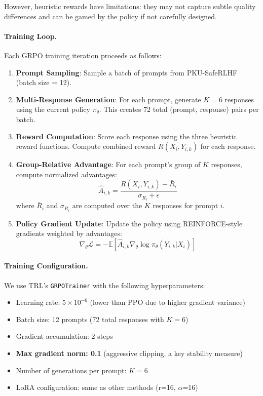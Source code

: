 However, heuristic rewards have limitations: they may not capture subtle quality differences and can be gamed by the policy if not carefully designed.

\paragraph{Training Loop.} Each GRPO training iteration proceeds as follows:

\begin{enumerate}[leftmargin=*]
    \item \textbf{Prompt Sampling}: Sample a batch of prompts from PKU-SafeRLHF (batch size = 12).

    \item \textbf{Multi-Response Generation}: For each prompt, generate $K=6$ responses using the current policy $\pi_\theta$. This creates 72 total (prompt, response) pairs per batch.

    \item \textbf{Reward Computation}: Score each response using the three heuristic reward functions. Compute combined reward $R(X_i, Y_{i,k})$ for each response.

    \item \textbf{Group-Relative Advantage}: For each prompt's group of $K$ responses, compute normalized advantages:
    \begin{equation*}
        \hat{A}_{i,k} = \frac{R(X_i, Y_{i,k}) - \bar{R}_i}{\sigma_{R_i} + \epsilon}
    \end{equation*}
    where $\bar{R}_i$ and $\sigma_{R_i}$ are computed over the $K$ responses for prompt $i$.

    \item \textbf{Policy Gradient Update}: Update the policy using REINFORCE-style gradients weighted by advantages:
    \begin{equation*}
        \nabla_\theta \mathcal{L} = -\mathbb{E}\left[ \hat{A}_{i,k} \nabla_\theta \log \pi_\theta(Y_{i,k} | X_i) \right]
    \end{equation*}
\end{enumerate}

\paragraph{Training Configuration.} We use TRL's \texttt{GRPOTrainer} with the following hyperparameters:
\begin{itemize}[leftmargin=*]
    \item Learning rate: $5 \times 10^{-6}$ (lower than PPO due to higher gradient variance)
    \item Batch size: 12 prompts (72 total responses with $K=6$)
    \item Gradient accumulation: 2 steps
    \item \textbf{Max gradient norm: 0.1} (aggressive clipping, a key stability measure)
    \item Number of generations per prompt: $K=6$
    \item LoRA configuration: same as other methods (r=16, $\alpha$=16)
\end{itemize}

